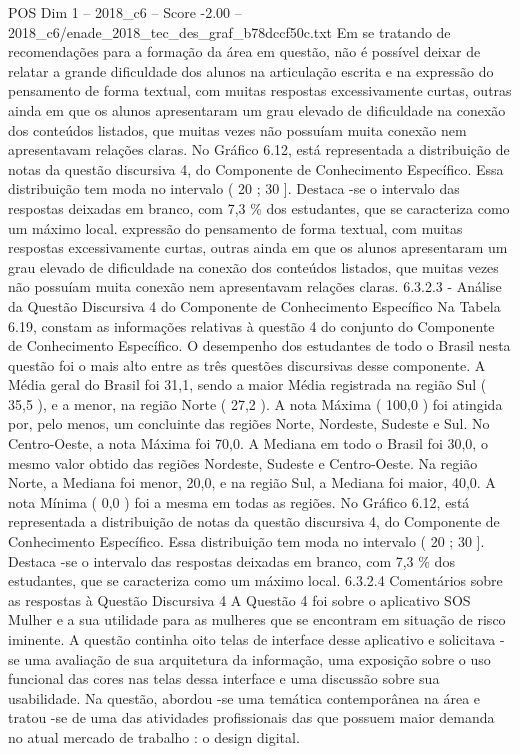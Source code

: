 \begin{textsample}{POS Dim 1 – 2018\_c6 – Score -2.00 – 2018\_c6/enade\_2018\_tec\_des\_graf\_b78dccf50c.txt}
Em se tratando de recomendações para a formação da área em questão, não é possível deixar de relatar a grande dificuldade dos alunos na articulação escrita e na expressão do pensamento de forma textual, com muitas respostas excessivamente curtas, outras ainda em que os alunos apresentaram um grau elevado de dificuldade na conexão dos conteúdos listados, que muitas vezes não possuíam muita conexão nem apresentavam relações claras.
No Gráfico 6.12, está representada a distribuição de notas da questão discursiva 4, do Componente de Conhecimento Específico.
Essa distribuição tem moda no intervalo ( 20 ; 30 ].
Destaca -se o intervalo das respostas deixadas em branco, com 7,3 \% dos estudantes, que se caracteriza como um máximo local. expressão do pensamento de forma textual, com muitas respostas excessivamente curtas, outras ainda em que os alunos apresentaram um grau elevado de dificuldade na conexão dos conteúdos listados, que muitas vezes não possuíam muita conexão nem apresentavam relações claras. 6.3.2.3 - Análise da Questão Discursiva 4 do Componente de Conhecimento Específico Na Tabela 6.19, constam as informações relativas à questão 4 do conjunto do Componente de Conhecimento Específico.
O desempenho dos estudantes de todo o Brasil nesta questão foi o mais alto entre as três questões discursivas desse componente.
A Média geral do Brasil foi 31,1, sendo a maior Média registrada na região Sul ( 35,5 ), e a menor, na região Norte ( 27,2 ).
A nota Máxima ( 100,0 ) foi atingida por, pelo menos, um concluinte das regiões Norte, Nordeste, Sudeste e Sul.
No Centro-Oeste, a nota Máxima foi 70,0.
A Mediana em todo o Brasil foi 30,0, o mesmo valor obtido das regiões Nordeste, Sudeste e Centro-Oeste.
Na região Norte, a Mediana foi menor, 20,0, e na região Sul, a Mediana foi maior, 40,0.
A nota Mínima ( 0,0 ) foi a mesma em todas as regiões.
No Gráfico 6.12, está representada a distribuição de notas da questão discursiva 4, do Componente de Conhecimento Específico.
Essa distribuição tem moda no intervalo ( 20 ; 30 ].
Destaca -se o intervalo das respostas deixadas em branco, com 7,3 \% dos estudantes, que se caracteriza como um máximo local. 6.3.2.4 Comentários sobre as respostas à Questão Discursiva 4 A Questão 4 foi sobre o aplicativo SOS Mulher e a sua utilidade para as mulheres que se encontram em situação de risco iminente.
A questão continha oito telas de interface desse aplicativo e solicitava -se uma avaliação de sua arquitetura da informação, uma exposição sobre o uso funcional das cores nas telas dessa interface e uma discussão sobre sua usabilidade.
Na questão, abordou -se uma temática contemporânea na área e tratou -se de uma das atividades profissionais das que possuem maior demanda no atual mercado de trabalho : o design digital.

\end{textsample}
